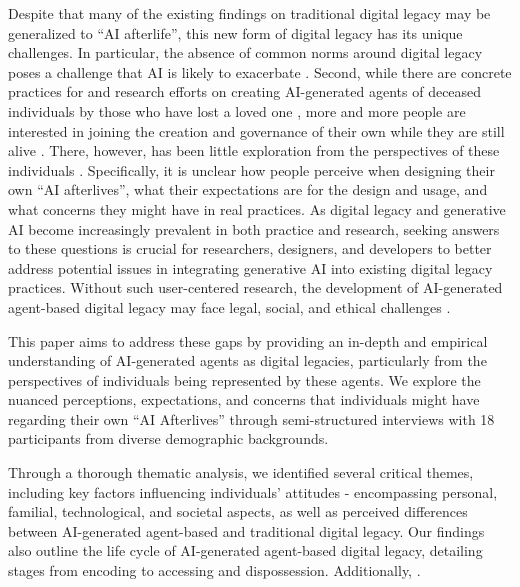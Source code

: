 Despite that many of the existing findings on traditional digital legacy may be generalized to ``AI afterlife'', this new form of digital legacy has its unique challenges.  In particular, the absence of common norms around digital legacy \cite{pfister2017will} poses a challenge that AI is likely to exacerbate \cite{morris2024generative}.
Second, while there are concrete practices \cite{guardian2024chinese, bbc2024the, cnn2024when, projectdecember, meet2020} for and research efforts \cite{abramson2020creating, morris2024generative, brubaker2024ai, AugmentedMIT} on creating AI-generated agents of deceased individuals by those who have lost a loved one \cite{guardian2024chinese, bbc2024the, cnn2024when}, more and more people are interested in joining the creation and governance of their own  while they are still alive \cite{hereafter2022, rememory}. 
There, however, has been little exploration from the perspectives of these individuals \cite{xygkou2023conversation}. 
Specifically, it is unclear how people perceive  when designing their own ``AI afterlives'', what their expectations are for the design and usage, and what concerns they might have in real practices. As digital legacy and generative AI become increasingly prevalent in both practice and research, seeking answers to these questions is crucial for researchers, designers, and developers to better address potential issues in integrating generative AI into existing digital legacy practices. Without such user-centered research, the development of AI-generated agent-based digital legacy may face legal, social, and ethical challenges \cite{guardian2024george, weidinger2023sociotechnical}.

This paper aims to address these gaps by providing an in-depth and empirical understanding of AI-generated agents as digital legacies, particularly from the perspectives of individuals being represented by these agents. We explore the nuanced perceptions, expectations, and concerns that individuals might have regarding their own ``AI Afterlives'' through semi-structured interviews with 18 participants from diverse demographic backgrounds.

Through a thorough thematic analysis, we identified several critical themes, including key factors influencing individuals' attitudes - encompassing personal, familial, technological, and societal aspects, as well as perceived differences between AI-generated agent-based and traditional digital legacy. Our findings also outline the life cycle of AI-generated agent-based digital legacy, detailing stages from encoding to accessing and dispossession. Additionally, . 

